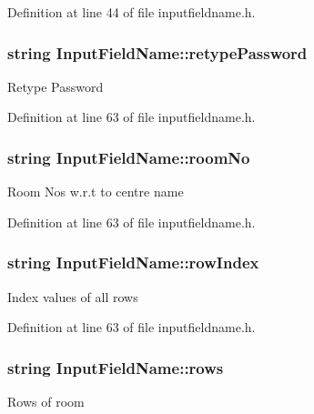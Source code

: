 \-Definition at line 44 of file inputfieldname.\-h.

\hypertarget{classInputFieldName_acd50095ae8540a735bcd5787b904b06c}{
\subsubsection[{retype\-Password}]{\setlength{\rightskip}{0pt plus 5cm}string {\bf \-Input\-Field\-Name\-::retype\-Password}}}\label{dd/db2/classInputFieldName_acd50095ae8540a735bcd5787b904b06c}
\-Retype \-Password 

\-Definition at line 63 of file inputfieldname.\-h.

\hypertarget{classInputFieldName_abb6b245e03e76aa29d7ef8733298e72f}{
\subsubsection[{room\-No}]{\setlength{\rightskip}{0pt plus 5cm}string {\bf \-Input\-Field\-Name\-::room\-No}}}\label{dd/db2/classInputFieldName_abb6b245e03e76aa29d7ef8733298e72f}
\-Room \-Nos w.\-r.\-t to centre name 

\-Definition at line 63 of file inputfieldname.\-h.

\hypertarget{classInputFieldName_adfb1d136313267eecabe30391a03b49b}{
\subsubsection[{row\-Index}]{\setlength{\rightskip}{0pt plus 5cm}string {\bf \-Input\-Field\-Name\-::row\-Index}}}\label{dd/db2/classInputFieldName_adfb1d136313267eecabe30391a03b49b}
\-Index values of all rows 

\-Definition at line 63 of file inputfieldname.\-h.

\hypertarget{classInputFieldName_a1b5a819437f52b4bb6b0ea59f542f9a9}{
\subsubsection[{rows}]{\setlength{\rightskip}{0pt plus 5cm}string {\bf \-Input\-Field\-Name\-::rows}}}\label{dd/db2/classInputFieldName_a1b5a819437f52b4bb6b0ea59f542f9a9}
\-Rows of room 

